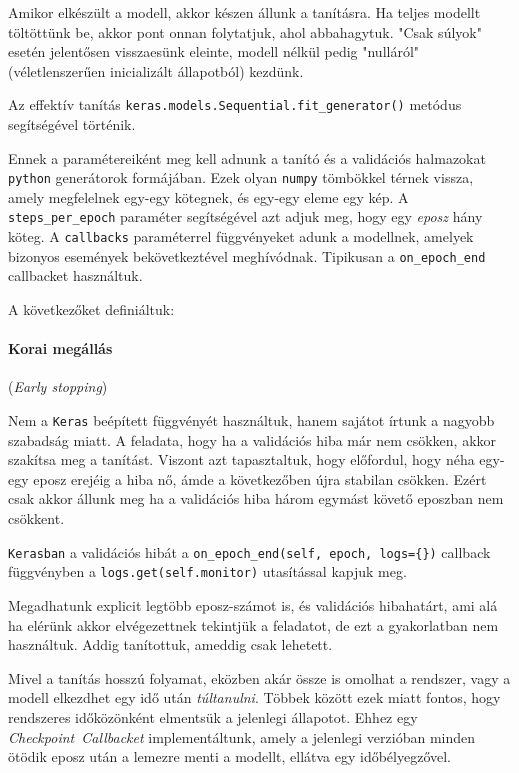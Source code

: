 Amikor elkészült a modell, akkor készen állunk a tanításra. Ha teljes modellt töltöttünk be,
akkor pont onnan folytatjuk, ahol abbahagytuk. "Csak súlyok" esetén jelentősen visszaesünk 
eleinte, modell nélkül pedig "nulláról"(véletlenszerűen inicializált állapotból) kezdünk.

Az effektív tanítás \texttt{keras.models.Sequential.fit\_generator()} metódus segítségével 
történik.

Ennek a paramétereiként meg kell adnunk a tanító és a validációs halmazokat \texttt{python} 
generátorok formájában. Ezek olyan \texttt{numpy} tömbökkel térnek vissza, amely megfelelnek 
egy-egy kötegnek, és egy-egy eleme egy kép. A \texttt{steps\_per\_epoch} paraméter segítségével azt adjuk
meg, hogy egy \textit{eposz} hány köteg. A \texttt{callbacks} paraméterrel függvényeket
adunk a modellnek, amelyek bizonyos események bekövetkeztével meghívódnak. Tipikusan a
\texttt{on\_epoch\_end} callbacket használtuk.

\noindent
A következőket definiáltuk:

\paragraph{Korai megállás} (\textit{Early stopping})

Nem a \texttt{Keras} beépített függvényét használtuk, hanem sajátot írtunk a
nagyobb szabadság miatt. A feladata, hogy ha a validációs hiba már nem csökken, akkor 
szakítsa meg a tanítást. Viszont azt tapasztaltuk, hogy előfordul, hogy néha
egy-egy eposz erejéig a hiba nő, ámde a következőben újra stabilan csökken.
Ezért csak akkor állunk meg ha a validációs hiba három egymást követő eposzban
nem csökkent.

\texttt{Kerasban} a validációs hibát a \texttt{on\_epoch\_end(self, epoch, logs=\{\})} 
callback függvényben a \texttt{logs.get(self.monitor)} utasítással kapjuk meg.

Megadhatunk explicit legtöbb eposz-számot is, és validációs hibahatárt, ami alá ha
elérünk akkor elvégezettnek tekintjük a feladatot, de ezt a gyakorlatban nem használtuk.
Addig tanítottuk, ameddig csak lehetett.


Mivel a tanítás hosszú folyamat, eközben akár össze is omolhat a rendszer, vagy
a modell elkezdhet egy idő után \textit{túltanulni}. Többek között ezek miatt fontos,
hogy rendszeres időközönként elmentsük a jelenlegi állapotot. Ehhez egy 
\textit{Checkpoint~Callbacket} implementáltunk, amely a jelenlegi verzióban minden ötödik
eposz után a lemezre menti a modellt, ellátva egy időbélyegzővel.



